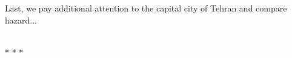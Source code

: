 Last, we pay additional attention to the capital city of Tehran and compare hazard...

~\\
* * *
\\










